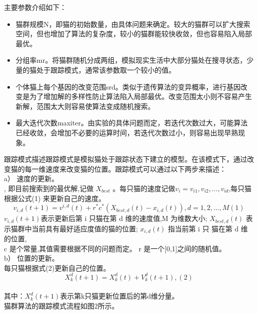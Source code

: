 \documentclass[UTF8]{ctexart}
\begin{document}
\indent 主要参数介绍如下：\\
\begin{itemize}
	\item{猫群规模N，即猫的初始数量，由具体问题来确定。较大的猫群可以扩大搜索空间，但也增加了算法的复杂度，较小的猫群能较快收敛，但也容易陷入局部最优。}
	\item{分组率mr。将猫群随机分成两组，模拟现实生活中大部分猫处在搜寻状态，少量的猫处于跟踪模式，通常该参数取一个较小的值。}
	\item{个体猫上每个基因的改变范围srd。类似于遗传算法的变异概率，进行基因改变是为了增加解的多样性防止算法陷入局部最优。改变范围太小则不容易产生新解，范围太大则容易使算法变成随机搜索。}
	\item{最大迭代次数maxiter。由实验的具体问题而定，若迭代次数过大，可能算法已经收敛，会增加不必要的运算时间，若迭代次数过小，则容易出现早熟现象。}
\end{itemize}
\begin{subsection}
{跟踪模式描述}跟踪模式是模拟猫处于跟踪状态下建立的模型。在该模式下，通过改变猫的每一维速度来改变猫的位置。跟踪模式可以通过以下两步来描述：\\a） 速度的更新。\\ , 即目前搜索到的最优解,记做 $X_{best}$ 。每只猫的速度记做$v_i ={v_{i1},v_{i2},...,v_{id}}$,每只猫根据公式(1) 来更新自己的速度。$$v_{i,d}(t+1) = v^{i,d}(t) + r^* c^*(X_{best,d}(t) - x_{i,d}(t)),d = 1,2,...,M (1) $$ 
$v_{i,d}(t+1)$表示更新后第 i 只猫在第 d 维的速度值,M 为维数大小; 
$X_{best,d}(t)$ 表示猫群中当前具有最好适应度值的猫的位置; 
$x_{i,d}(t)$ 指当前第 i 只 猫在第 d 维的位置,\\c 是个常量,其值需要根据不同的问题而定。
r 是一个[0,1]之间的随机值。\\b） 位置的更新。\\ \indent 每只猫根据式(2)更新自己的位置。$$X_k^d(t+1) = X_k^d(t) + V_k^d(t+1),    (2)$$\\其中：$X_k^d(t+1)$表示第k只猫更新位置后的第d维分量。\\ \indent 猫群算法的跟踪模式流程如图2所示。
\end{subsection}
\end{document}
